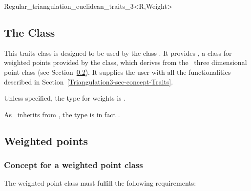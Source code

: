 	\begin{ccClassTemplate}{Regular_triangulation_euclidean_traits_3<R,Weight>}
	\subsection{The Class \protect
{} }
	\label{Triangulation3-sec-class-Regulartraits}

This traits class is designed to be used by the class
. It provides
, a class for weighted points
provided by the class, which derives from the \cgal\ three dimensional
point class (see
Section~\ref{Triangulation3-sec-class-Weightedpoints}). It supplies
the user with all the functionalities 
described in Section~\ref{Triangulation3-sec-concept-Traits}.



\ccTypes
{}

\ccGlue
{}

Unless specified, the type  for weights is . 

As \ccClassTemplateName\ inherits from
, the  type is in
fact .

	\end{ccClassTemplate}

		\subsection{Weighted points}	
		\label{Triangulation3-sec-class-Weightedpoints}

		\subsubsection{Concept for a weighted point class}

The weighted point class must fulfill the following requirements:

\ccTypes
{}
\ccGlue
{}
\ccGlue
{}

